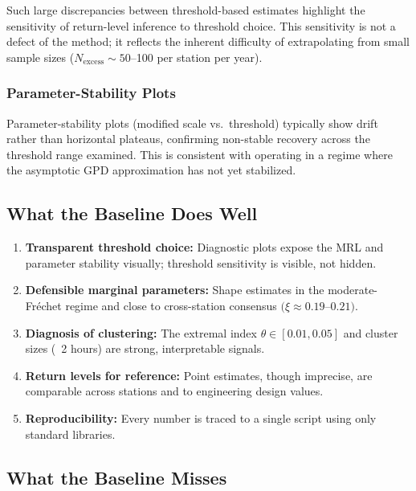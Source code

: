 Such large discrepancies between threshold-based estimates highlight the sensitivity of return-level inference to threshold choice. This sensitivity is not a defect of the method; it reflects the inherent difficulty of extrapolating from small sample sizes ($N_{\text{excess}} \sim 50$--100 per station per year).

\subsubsection{Parameter-Stability Plots}

Parameter-stability plots (modified scale vs.~threshold) typically show drift rather than horizontal plateaus, confirming non-stable recovery across the threshold range examined. This is consistent with operating in a regime where the asymptotic GPD approximation has not yet stabilized.

\subsection{What the Baseline Does Well}

\begin{enumerate}
    \item \textbf{Transparent threshold choice:} Diagnostic plots expose the MRL and parameter stability visually; threshold sensitivity is visible, not hidden.
    \item \textbf{Defensible marginal parameters:} Shape estimates in the moderate-Fréchet regime and close to cross-station consensus $(\xi \approx 0.19$--$0.21)$.
    \item \textbf{Diagnosis of clustering:} The extremal index $\theta \in [0.01, 0.05]$ and cluster sizes (~2 hours) are strong, interpretable signals.
    \item \textbf{Return levels for reference:} Point estimates, though imprecise, are comparable across stations and to engineering design values.
    \item \textbf{Reproducibility:} Every number is traced to a single script using only standard libraries.
\end{enumerate}

\subsection{What the Baseline Misses}

